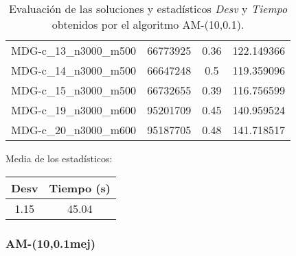 \documentclass{article}
\begin{document}
\begin{table}[H]
\begin{tabular}{|cccc|}
		MDG-c\_13\_n3000\_m500 & 66773925 & 0.36 & 122.149366\\
		MDG-c\_14\_n3000\_m500 & 66647248 & 0.5 & 119.359096\\
		MDG-c\_15\_n3000\_m500 & 66732655 & 0.39 & 116.756599\\
		MDG-c\_19\_n3000\_m600 & 95201709 & 0.45 & 140.959524\\
		MDG-c\_20\_n3000\_m600 & 95187705 & 0.48 & 141.718517\\
		\hline
	\end{tabular}
	\caption{Evaluación de las soluciones y estadísticos \emph{Desv} y \emph{Tiempo} obtenidos por el algoritmo AM-(10,0.1).}
	\label{tab:am-10-01}
\end{table}

Media de los estadísticos:
\begin{table}[H]
	\centering
	\begin{tabular}{|cc|}
		\hline
		Desv & Tiempo (s)\\ \hline
		1.15 & 45.04 \\
		\hline
	\end{tabular}
\end{table}

\pagebreak

\subsubsection*{AM-(10,0.1mej)}
\end{document}
